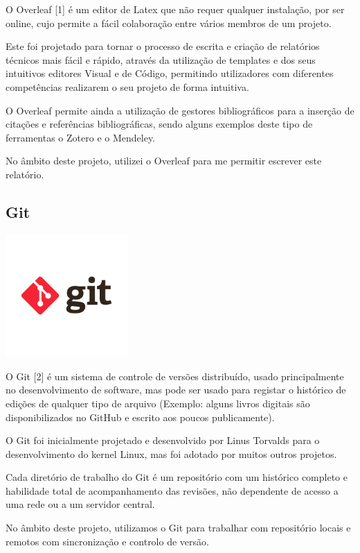 \documentclass[a4paper,12pt]{article}
\begin{document}
O Overleaf [1] é um editor de Latex que não requer qualquer instalação, por ser online, cujo permite a fácil colaboração entre vários membros de um projeto.

Este foi projetado para tornar o processo de escrita e criação de relatórios técnicos mais fácil e rápido, através da utilização de templates e dos seus intuitivos editores Visual e de Código, permitindo utilizadores com diferentes competências realizarem o seu projeto de forma intuitiva.

O Overleaf permite ainda a utilização de gestores bibliográficos para a inserção de citações e referências bibliográficas, sendo alguns exemplos deste tipo de ferramentas o Zotero e o Mendeley.

No âmbito deste projeto, utilizei o Overleaf para me permitir escrever este relatório.

\subsection{Git}
    \includegraphics[width=0.35\textwidth]{git.png} %
    \vspace{0.5cm}

O Git [2] é um sistema de controle de versões distribuído, usado principalmente no desenvolvimento de software, mas pode ser usado para registar o histórico de edições de qualquer tipo de arquivo (Exemplo: alguns livros digitais são disponibilizados no GitHub e escrito aos poucos publicamente).

O Git foi inicialmente projetado e desenvolvido por Linus Torvalds para o desenvolvimento do kernel Linux, mas foi adotado por muitos outros projetos.

Cada diretório de trabalho do Git é um repositório com um histórico completo e habilidade total de acompanhamento das revisões, não dependente de acesso a uma rede ou a um servidor central.

No âmbito deste projeto, utilizamos o Git para trabalhar com repositório locais e remotos com sincronização e controlo de versão.
\end{document}
